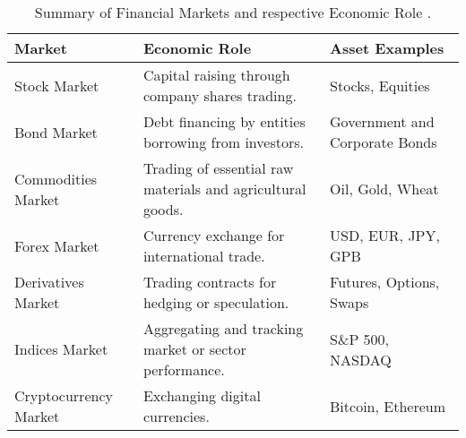 \begin{table}[htb!]
\centering
\footnotesize
\begin{tabularx}{\textwidth}{@{}lXl@{}}
\toprule
\textbf{Market} & \textbf{Economic Role} & \textbf{Asset Examples} \\
\midrule
Stock Market & Capital raising through company shares trading. & Stocks, Equities \\
\addlinespace
Bond Market & Debt financing by entities borrowing from investors. & Government and Corporate Bonds \\
\addlinespace
Commodities Market & Trading of essential raw materials and agricultural goods. & Oil, Gold, Wheat \\
\addlinespace
Forex Market & Currency exchange for international trade. & USD, EUR, JPY, GPB \\
\addlinespace
Derivatives Market & Trading contracts for hedging or speculation. & Futures, Options, Swaps \\
\addlinespace
Indices Market & Aggregating and tracking market or sector performance. & S\&P 500, NASDAQ \\
\addlinespace
Cryptocurrency Market & Exchanging digital currencies. & Bitcoin, Ethereum \\
\bottomrule
\end{tabularx}
\caption{Summary of Financial Markets and respective Economic Role \cite{brandimarte_introduction_2018}.}
\label{Tables:FinancialMarkets}
\end{table}
